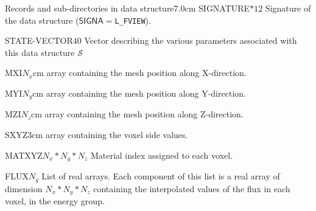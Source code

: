 \begin{DescriptionEnregistrement}{Records and sub-directories
 in  data structure}{7.0cm}
\CharEnr
 {SIGNATURE}{$*12$}
 {Signature of the  data structure ($\mathsf{SIGNA}=${\tt L\_FVIEW}).}

\IntEnr
  {STATE-VECTOR}{$40$}
  {Vector describing the various parameters associated with this data structure
  $\mathcal{S}$}

\RealEnr
  {MXI}{$N_{x}$}{cm}
  {array containing the mesh position along X-direction.}

\RealEnr
  {MYI}{$N_{y}$}{cm}
  {array containing the mesh position along Y-direction.}

\RealEnr
  {MZI}{$N_{z}$}{cm}
  {array containing the mesh position along Z-direction.}

\RealEnr
  {SXYZ}{3}{cm}
  {array containing the voxel side values.}

\IntEnr
  {MATXYZ}{$N_{x}*N_{y}*N_{z}$}
  {Material index assigned to each voxel.}

\DirlEnr
  {FLUX}{$N_{g}$}
  {List of real arrays. Each component of this list is a real array of dimension $N_{x}*N_{y}*N_{z}$ containing
   the interpolated values of the flux in each voxel, in the energy group.}

\end{DescriptionEnregistrement}
